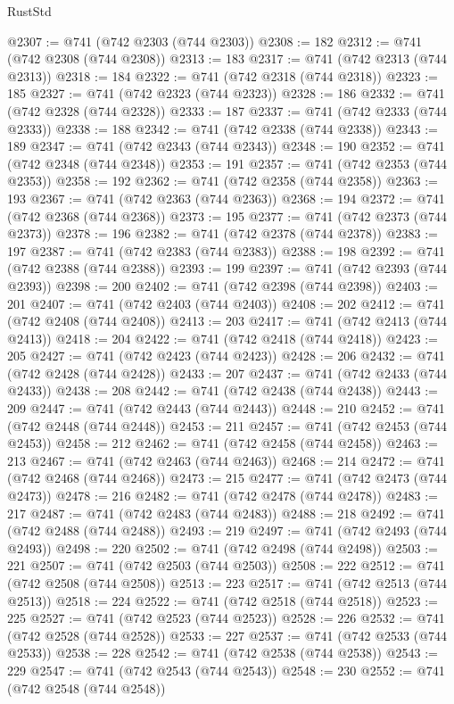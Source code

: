 \begin{lexlean}{RustStd}
\begin{coremodule}
@2307 := @741 (@742 @2303 (@744 @2303))
@2308 := 182
@2312 := @741 (@742 @2308 (@744 @2308))
@2313 := 183
@2317 := @741 (@742 @2313 (@744 @2313))
@2318 := 184
@2322 := @741 (@742 @2318 (@744 @2318))
@2323 := 185
@2327 := @741 (@742 @2323 (@744 @2323))
@2328 := 186
@2332 := @741 (@742 @2328 (@744 @2328))
@2333 := 187
@2337 := @741 (@742 @2333 (@744 @2333))
@2338 := 188
@2342 := @741 (@742 @2338 (@744 @2338))
@2343 := 189
@2347 := @741 (@742 @2343 (@744 @2343))
@2348 := 190
@2352 := @741 (@742 @2348 (@744 @2348))
@2353 := 191
@2357 := @741 (@742 @2353 (@744 @2353))
@2358 := 192
@2362 := @741 (@742 @2358 (@744 @2358))
@2363 := 193
@2367 := @741 (@742 @2363 (@744 @2363))
@2368 := 194
@2372 := @741 (@742 @2368 (@744 @2368))
@2373 := 195
@2377 := @741 (@742 @2373 (@744 @2373))
@2378 := 196
@2382 := @741 (@742 @2378 (@744 @2378))
@2383 := 197
@2387 := @741 (@742 @2383 (@744 @2383))
@2388 := 198
@2392 := @741 (@742 @2388 (@744 @2388))
@2393 := 199
@2397 := @741 (@742 @2393 (@744 @2393))
@2398 := 200
@2402 := @741 (@742 @2398 (@744 @2398))
@2403 := 201
@2407 := @741 (@742 @2403 (@744 @2403))
@2408 := 202
@2412 := @741 (@742 @2408 (@744 @2408))
@2413 := 203
@2417 := @741 (@742 @2413 (@744 @2413))
@2418 := 204
@2422 := @741 (@742 @2418 (@744 @2418))
@2423 := 205
@2427 := @741 (@742 @2423 (@744 @2423))
@2428 := 206
@2432 := @741 (@742 @2428 (@744 @2428))
@2433 := 207
@2437 := @741 (@742 @2433 (@744 @2433))
@2438 := 208
@2442 := @741 (@742 @2438 (@744 @2438))
@2443 := 209
@2447 := @741 (@742 @2443 (@744 @2443))
@2448 := 210
@2452 := @741 (@742 @2448 (@744 @2448))
@2453 := 211
@2457 := @741 (@742 @2453 (@744 @2453))
@2458 := 212
@2462 := @741 (@742 @2458 (@744 @2458))
@2463 := 213
@2467 := @741 (@742 @2463 (@744 @2463))
@2468 := 214
@2472 := @741 (@742 @2468 (@744 @2468))
@2473 := 215
@2477 := @741 (@742 @2473 (@744 @2473))
@2478 := 216
@2482 := @741 (@742 @2478 (@744 @2478))
@2483 := 217
@2487 := @741 (@742 @2483 (@744 @2483))
@2488 := 218
@2492 := @741 (@742 @2488 (@744 @2488))
@2493 := 219
@2497 := @741 (@742 @2493 (@744 @2493))
@2498 := 220
@2502 := @741 (@742 @2498 (@744 @2498))
@2503 := 221
@2507 := @741 (@742 @2503 (@744 @2503))
@2508 := 222
@2512 := @741 (@742 @2508 (@744 @2508))
@2513 := 223
@2517 := @741 (@742 @2513 (@744 @2513))
@2518 := 224
@2522 := @741 (@742 @2518 (@744 @2518))
@2523 := 225
@2527 := @741 (@742 @2523 (@744 @2523))
@2528 := 226
@2532 := @741 (@742 @2528 (@744 @2528))
@2533 := 227
@2537 := @741 (@742 @2533 (@744 @2533))
@2538 := 228
@2542 := @741 (@742 @2538 (@744 @2538))
@2543 := 229
@2547 := @741 (@742 @2543 (@744 @2543))
@2548 := 230
@2552 := @741 (@742 @2548 (@744 @2548))

\end{coremodule}
\end{lexlean}
